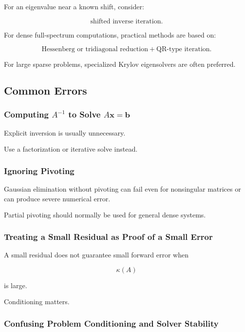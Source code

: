 For an eigenvalue near a known shift, consider:

\[
\boxed{
\text{shifted inverse iteration}.
}
\]

For dense full-spectrum computations, practical methods are based on:

\[
\boxed{
\text{Hessenberg or tridiagonal reduction}
+
\text{QR-type iteration}.
}
\]

For large sparse problems, specialized Krylov eigensolvers are often
preferred.

\subsection{Common Errors}
\label{subsec:nla-common-errors}

\subsubsection{Computing \(A^{-1}\) to Solve \(A\mathbf{x}=\mathbf{b}\)}

Explicit inversion is usually unnecessary.

Use a factorization or iterative solve instead.

\subsubsection{Ignoring Pivoting}

Gaussian elimination without pivoting can fail even for nonsingular
matrices or can produce severe numerical error.

Partial pivoting should normally be used for general dense systems.

\subsubsection{Treating a Small Residual as Proof of a Small Error}

A small residual does not guarantee small forward error when

\[
\kappa(A)
\]

is large.

Conditioning matters.

\subsubsection{Confusing Problem Conditioning and Solver Stability}


